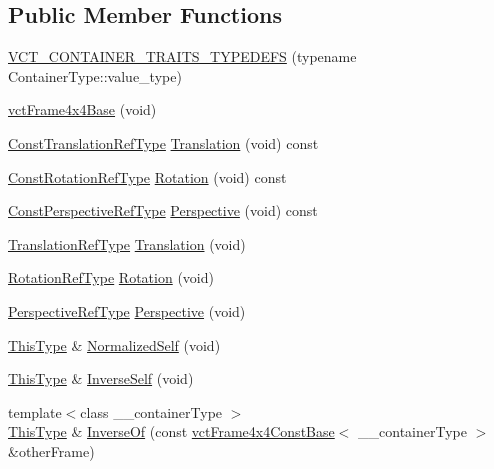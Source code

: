 \subsection*{Public Member Functions}
\begin{DoxyCompactItemize}
\item 
\hyperlink{classvct_frame4x4_base_aa75be9a8ceb761e82469ae8e682160ed}{V\-C\-T\-\_\-\-C\-O\-N\-T\-A\-I\-N\-E\-R\-\_\-\-T\-R\-A\-I\-T\-S\-\_\-\-T\-Y\-P\-E\-D\-E\-F\-S} (typename Container\-Type\-::value\-\_\-type)
\item 
\hyperlink{classvct_frame4x4_base_a6dd4d739de77628b08f596d3377079a2}{vct\-Frame4x4\-Base} (void)
\item 
\hyperlink{classvct_frame4x4_base_a720869bcd28db8ef2f9f13294097e99e}{Const\-Translation\-Ref\-Type} \hyperlink{classvct_frame4x4_base_ac5a213c0ecde1dd703ba43dfa949a3ae}{Translation} (void) const 
\item 
\hyperlink{classvct_frame4x4_base_a427cd6a2c5f48f68fde733a9b51a83e3}{Const\-Rotation\-Ref\-Type} \hyperlink{classvct_frame4x4_base_a4c3a4618f22eb091b192e13b086fe71c}{Rotation} (void) const 
\item 
\hyperlink{classvct_frame4x4_base_a47161d0a7598341722759640af9413e5}{Const\-Perspective\-Ref\-Type} \hyperlink{classvct_frame4x4_base_af316050673cbf0d655aadc37af5f1014}{Perspective} (void) const 
\item 
\hyperlink{classvct_frame4x4_base_a0450063a4ebdf0f0c87c7f3fa789a17f}{Translation\-Ref\-Type} \hyperlink{classvct_frame4x4_base_a01cb309043ca7c26e8161e634603824e}{Translation} (void)
\item 
\hyperlink{classvct_frame4x4_base_a57cec1ba52b9787d77da60fb020c1999}{Rotation\-Ref\-Type} \hyperlink{classvct_frame4x4_base_a16eca5fb18cb4a73f54f1694f019d57d}{Rotation} (void)
\item 
\hyperlink{classvct_frame4x4_base_a445582cef7ba9f03553b1d9e63a2d64c}{Perspective\-Ref\-Type} \hyperlink{classvct_frame4x4_base_a226f75f603ddd25a970c145b7eb3b0df}{Perspective} (void)
\item 
\hyperlink{classvct_frame4x4_base_af6dcf167c0c3965872a095ce28853598}{This\-Type} \& \hyperlink{classvct_frame4x4_base_a4f7e738185921ab11a5c4db9e9d05ecc}{Normalized\-Self} (void)
\item 
\hyperlink{classvct_frame4x4_base_af6dcf167c0c3965872a095ce28853598}{This\-Type} \& \hyperlink{classvct_frame4x4_base_a7d9a54234186c138b4d09aa9577da2e8}{Inverse\-Self} (void)
\item 
{\footnotesize template$<$class \-\_\-\-\_\-container\-Type $>$ }\\\hyperlink{classvct_frame4x4_base_af6dcf167c0c3965872a095ce28853598}{This\-Type} \& \hyperlink{classvct_frame4x4_base_ae11e6b69c6bc550c261d2c117aba013c}{Inverse\-Of} (const \hyperlink{classvct_frame4x4_const_base}{vct\-Frame4x4\-Const\-Base}$<$ \-\_\-\-\_\-container\-Type $>$ \&other\-Frame)
\end{DoxyCompactItemize}
